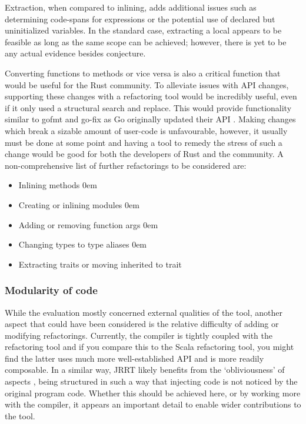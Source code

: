 Extraction, when compared to inlining, adds additional issues such as determining code-spans for expressions or the potential use of declared but uninitialized variables. In the standard case, extracting a local appears to be feasible as long as the same scope can be achieved; however, there is yet to be any actual evidence besides conjecture.

Converting functions to methods or vice versa is also a critical function that would be useful for the Rust community. To alleviate issues with API changes, supporting these changes with a refactoring tool would be incredibly useful, even if it only used a structural search and replace. This would provide functionality similar to gofmt and go-fix as Go originally updated their API \cite{gofix11}. Making changes which break a sizable amount of user-code is unfavourable, however, it usually must be done at some point and having a tool to remedy the stress of such a change would be good for both the developers of Rust and the community. A non-comprehensive list of further refactorings to be considered are:

\begin{multicols}{2}
\begin{itemize}
\item Inlining methods
\itemsep0em 
\item Creating or inlining modules
\itemsep0em 
\item Adding or removing function args
\itemsep0em 
\item Changing types to type aliases
\itemsep0em 
\item Extracting traits or moving inherited to trait
\end{itemize}
\end{multicols}



\subsubsection{Modularity of code}
While the evaluation mostly concerned external qualities of the tool, another aspect that could have been considered is the relative difficulty of adding or modifying refactorings. Currently, the compiler is tightly coupled with the refactoring tool and if you compare this to the Scala refactoring tool, you might find the latter uses much more well-established API and is more readily composable. In a similar way, JRRT likely benefits from the `obliviousness' of aspects \cite{aop}, being structured in such a way that injecting code is not noticed by the original program code. Whether this should be achieved here, or by working more with the compiler, it appears an important detail to enable wider contributions to the tool.


